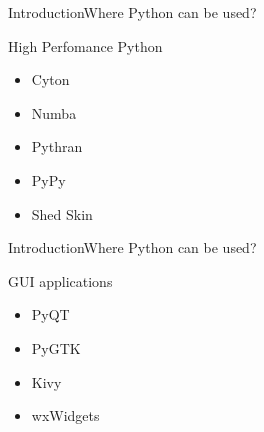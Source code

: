\documentclass[10pt]{beamer}
\begin{document}
\begin{frame}{Introduction}{Where Python can be used?}
	
	\begin{block}{High Perfomance Python}
		\begin{itemize}
			\item Cyton
			
			\item Numba
			
			\item Pythran
			
			\item PyPy
			
			\item Shed Skin
		\end{itemize}
		
	\end{block}
\end{frame}

\begin{frame}{Introduction}{Where Python can be used?}
	
	\begin{block}{GUI applications}
		\begin{itemize}
			\item PyQT
			
			\item PyGTK
			
			\item Kivy
			
			\item wxWidgets
	
		\end{itemize}
		
	\end{block}
\end{frame}
\end{document}
